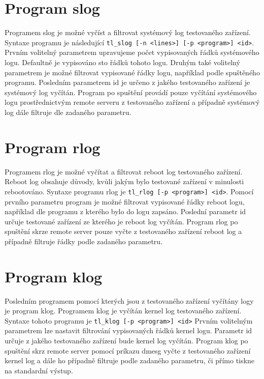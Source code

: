 \section{Program slog}
Programem slog je možné vyčíst a filtrovat systémový log testovaného zařízení. Syntaxe programu je následující \texttt{tl\_slog [-n <lines>] [-p <program>] <id>}. Prvním volitelný parametrem upravujeme počet vypisovaných řádků systémového logu. Defaultně je vypisováno sto řádků tohoto logu. Druhým také volitelný parametrem je možné filtrovat vypisované řádky logu, například podle spuštěného programu. Posledním parametrem id je určeno z jakého testovaného zařízení je systémový log vyčítán. Program po spuštění provádí pouze vyčítání systémového logu prostřednictvým remote serveru z testovaného zařízení a případně systémový log dále filtruje dle zadaného parametru.

\section{Program rlog}
Programem rlog je možné vyčítat a filtrovat reboot log testovaného zařízení. Reboot log obsahuje důvody, kvůli jakým bylo testované zařízení v minulosti rebootováno. Syntaxe programu rlog je \texttt{tl\_rlog [-p <program>] <id>}. Pomocí prvního parametru program je možné filtrovat vypisované řádky reboot logu, například dle programu z kterého bylo do logu zapsáno. Poslední parametr id určuje testované zařízení ze kterého je reboot log vyčítán. Program rlog po spuštění skrze remote server pouze vyčte z testovaného zařízení reboot log a případně filtruje řádky podle zadaného parametru.

\section{Program klog}
Posledním programem pomocí kterých jsou z testovaného zařízení vyčítány logy je program klog. Programem klog je vyčítán kernel log testovaného zařízení. Syntaxe tohoto programu je \texttt{tl\_klog [-p <program>] <id>} Prvním volitelným parametrem lze nastavit filtrování vypisovaných řádků kernel logu. Parametr id určuje z jakého testovaného zařízení bude kernel log vyčítán. Program klog po spuštění skrz remote server pomocí príkazu dmesg vyčte z testovaného zařízení kernel log a dále ho případně filtruje podle zadaného parametru, či přímo tiskne na standardní výstup.

